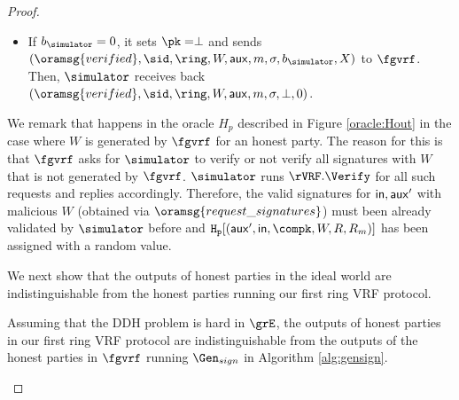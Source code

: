 \begin{proof}
\begin{itemize}
\begin{itemize}
			\item If $ b_\simulator = 0 $, it sets $ \pk = \perp $ and sends  $ (\oramsg{verified}, \allowbreak \sid, \allowbreak \ring, \allowbreak W, \allowbreak \aux, m, \sigma, b_\simulator, X) $ to $ \fgvrf $. Then, $ \simulator $ receives back $ (\oramsg{verified}, \allowbreak \sid, \allowbreak \ring, \allowbreak W, \aux,m, \sigma, \perp, 0) $. 
			
		\end{itemize}
		
		
		
		
		
		
	\end{itemize}
	
	We remark that  happens in the oracle $ H_p $ described in Figure \ref{oracle:Hout} in the case where $ W $ is generated by $ \fgvrf $ for an honest party. The reason for this is that $ \fgvrf $ asks for $ \simulator $ to verify or not verify all signatures with  $ W $ that is not generated by $ \fgvrf $. $ \simulator $ runs $ \rVRF.\Verify $ for all such requests and replies accordingly. Therefore, the valid signatures for $ \mathsf{in}, \mathsf{aux}' $ with malicious $ W $ (obtained via $ \oramsg{request\_signatures} $) must been already validated by $ \simulator $ before and $ \mathtt{H_p}[(\aux', \msg,\compk,W,R,R_m)] $ has been assigned with a random value. 
	
	We next show that the outputs of honest parties in the ideal world are indistinguishable from the honest parties running our first  ring VRF protocol.
	
	\begin{lemma}\label{lem:honestoutput}
		Assuming that the DDH problem is hard in $ \GG $, the outputs of honest parties in  our first ring VRF protocol are indistinguishable from the outputs of the honest parties in $ \fgvrf $ running $ \Gen_{sign} $  in Algorithm \ref{alg:gensign}.
	\end{lemma}


\end{proof}
